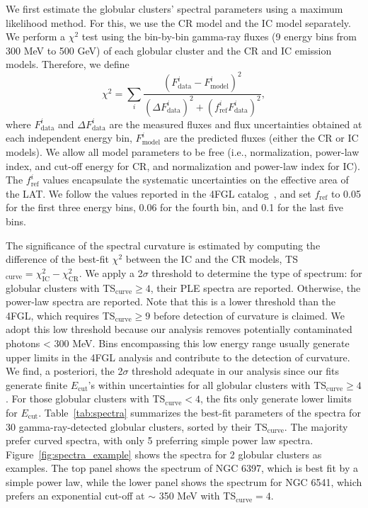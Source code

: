 \documentclass[doublespace,nopageskip]{VTthesis}
\begin{document}
We first estimate the globular clusters' spectral parameters using a maximum likelihood method. For this, we use the CR model and the IC model separately. We perform a $\chi^2$ test using the bin-by-bin gamma-ray fluxes (9 energy bins from 300 MeV to 500 GeV) of each globular cluster and the CR and IC emission models. Therefore, we define 
\begin{equation}
    \chi^2=\sum_i\frac{(F_\text{data}^i-F_\text{model}^i)^2}{(\Delta F_\text{data}^i)^2+(f_\text{ref}^i F_\text{data}^i)^2},
\end{equation}
where $F_\mathrm{data}^i$ and $\Delta F_\mathrm{data}^i$ are the measured fluxes and flux uncertainties obtained at each independent energy bin,  $F_\mathrm{model}^i$ are the predicted fluxes (either the CR or IC models). We allow all model parameters to be free (i.e., normalization, power-law index, and cut-off energy for CR, and normalization and power-law index for IC). The $f_\text{ref}^i$ values encapsulate the systematic uncertainties on the effective area of the LAT. We follow the values reported in the 4FGL catalog~\citep{2020ApJS..247...33A}, and set $f_\text{ref}$ to 0.05 for the first three energy bins, 0.06 for the fourth bin, and 0.1 for the last five bins.

The significance of the spectral curvature is estimated by computing the difference of the best-fit $\chi^2$ between the IC and the CR models, TS$_\mathrm{curve} = \chi^2_\text{IC} - \chi^2_\text{CR}.$ We apply a 2$\sigma$ threshold to determine the type of spectrum: for globular clusters with TS$_\mathrm{curve} \ge 4$, their PLE spectra are reported. Otherwise, the power-law spectra are reported. Note that this is a lower threshold than the 4FGL, which requires TS$_\mathrm{curve} \ge 9$ before detection of curvature is claimed. We adopt this low threshold because our analysis removes potentially contaminated photons < 300 MeV. Bins encompassing this low energy range usually generate upper limits in the 4FGL analysis and contribute to the detection of curvature. We find, a posteriori, the 2$\sigma$ threshold adequate in our analysis since our fits generate finite $E_\mathrm{cut}$'s within uncertainties for all globular clusters with TS$_\mathrm{curve} \ge 4$. For those globular clusters with TS$_\mathrm{curve} < 4$, the fits only generate lower limits for $E_\mathrm{cut}$. Table~\ref{tab:spectra} summarizes the best-fit parameters of the spectra for 30 gamma-ray-detected globular clusters, sorted by their TS$_\mathrm{curve}$. The majority prefer curved spectra, with only 5 preferring simple power law spectra. Figure~\ref{fig:spectra_example} shows the spectra for 2 globular clusters as examples. The top panel shows the spectrum of NGC 6397, which is best fit by a simple power law, while the lower panel shows the spectrum for NGC 6541, which prefers an exponential cut-off at $\sim$ 350 MeV with TS$_\mathrm{curve}=4$. 
\end{document}
